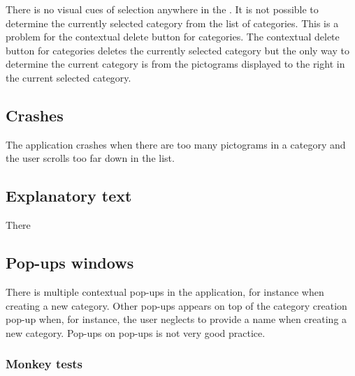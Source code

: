 There is no visual cues of selection anywhere in the \ct. It is not possible to determine the currently selected category from the list of categories. This is a problem for the contextual delete button for categories. The contextual delete button for categories deletes the currently selected category but the only way to determine the current category is from the pictograms displayed to the right in the current selected category. 

\subsection{Crashes}

The application crashes when there are too many pictograms in a category and the user scrolls too far down in the list. 

\subsection{Explanatory text}

There 

\subsection{Pop-ups windows}

There is multiple contextual pop-ups in the application, for instance when creating a new category. Other pop-ups appears on top of the category creation pop-up when, for instance, the user neglects to provide a name when creating a new category. Pop-ups on pop-ups is not very good practice.  







\subsubsection{Monkey tests}

